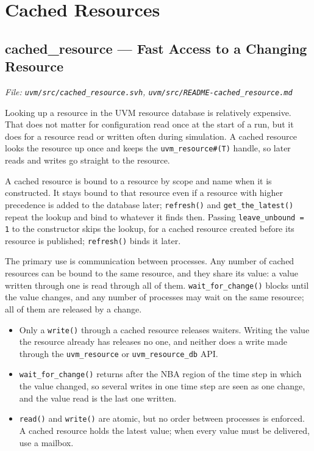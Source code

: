 \documentclass[11pt,letterpaper]{report}
\begin{document}
\chapter{Cached Resources}
\section{cached\_resource --- Fast Access to a Changing Resource}
\noindent\small\textit{File: \texttt{uvm/src/cached\_resource.svh}, \texttt{uvm/src/README-cached\_resource.md}}\par

Looking up a resource in the UVM resource database is relatively expensive. That does not matter for configuration read once at the start of a run, but it does for a resource read or written often during simulation. A cached resource looks the resource up once and keeps the \texttt{uvm\_resource\#(T)} handle, so later reads and writes go straight to the resource.

A cached resource is bound to a resource by scope and name when it is constructed. It stays bound to that resource even if a resource with higher precedence is added to the database later; \texttt{refresh()} and \texttt{get\_the\_latest()} repeat the lookup and bind to whatever it finds then. Passing \texttt{leave\_unbound = 1} to the constructor skips the lookup, for a cached resource created before its resource is published; \texttt{refresh()} binds it later.

The primary use is communication between processes. Any number of cached resources can be bound to the same resource, and they share its value: a value written through one is read through all of them. \texttt{wait\_for\_change()} blocks until the value changes, and any number of processes may wait on the same resource; all of them are released by a change.

\begin{itemize}
  \item Only a \texttt{write()} through a cached resource releases waiters. Writing the value the resource already has releases no one, and neither does a write made through the \texttt{uvm\_resource} or \texttt{uvm\_resource\_db} API.
  \item \texttt{wait\_for\_change()} returns after the NBA region of the time step in which the value changed, so several writes in one time step are seen as one change, and the value read is the last one written.
  \item \texttt{read()} and \texttt{write()} are atomic, but no order between processes is enforced. A cached resource holds the latest value; when every value must be delivered, use a mailbox.
\end{itemize}
\end{document}
